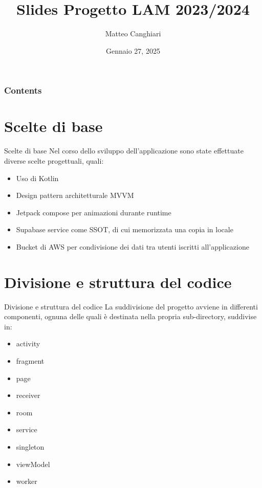 \documentclass[10pt]{beamer}
\title{\color{white}Slides Progetto LAM 2023/2024}
\author{Matteo Canghiari}
\institute[Informatica per il Management]{Informatica per il Management \\ Università di Bologna}
\date{Gennaio 27, 2025}
\begin{document}
\frame{\titlepage}

\begin{frame}
\frametitle{Contents}
\tableofcontents
\end{frame}

\section{Scelte di base}
\begin{frame}{Scelte di base}
Nel corso dello sviluppo dell'applicazione sono state effettuate diverse scelte progettuali, quali:
\begin{itemize}
    \item Uso di Kotlin
    \item Design pattern architetturale MVVM
    \item Jetpack compose per animazioni durante runtime
    \item Supabase service come SSOT, di cui memorizzata una copia in locale
    \item Bucket di AWS per condivisione dei dati tra utenti iscritti all'applicazione
\end{itemize}
\end{frame}

\section{Divisione e struttura del codice}
\begin{frame}{Divisione e struttura del codice}
La suddivisione del progetto avviene in differenti componenti, ognuna delle quali è destinata nella propria sub-directory, suddivise in:
\begin{itemize}
    \item activity
    \item fragment
    \item page
    \item receiver
    \item room
    \item service
    \item singleton 
    \item viewModel
    \item worker
\end{itemize}
\end{frame}
\end{document}
